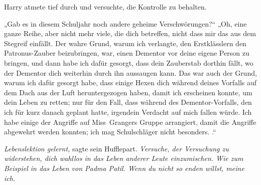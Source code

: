 Harry atmete tief durch und versuchte, die Kontrolle zu behalten.

„Gab es in diesem Schuljahr noch andere geheime Verschwörungen?“
„Oh, eine ganze Reihe, aber nicht mehr viele, die dich betreffen, nicht dass mir das aus dem Stegreif einfällt. Der wahre Grund, warum ich verlangte, den Erstklässlern den Patronus-Zauber beizubringen, war, einen Dementor vor deine eigene Person zu bringen, und dann habe ich dafür gesorgt, dass dein Zauberstab dorthin fällt, wo der Dementor dich weiterhin durch ihn aussaugen kann.  Das war auch der Grund, warum ich dafür gesorgt habe, dass einige Hexen dich während deines Vorfalls auf dem Dach aus der Luft heruntergezogen haben, damit ich erscheinen konnte, um dein Leben zu retten; nur für den Fall, dass während des Dementor-Vorfalls, den ich für kurz danach geplant hatte, irgendein Verdacht auf mich fallen würde.  Ich habe einige der Angriffe auf Miss~Grangers Gruppe arrangiert, damit die Angriffe abgewehrt werden konnten; ich mag Schulschläger nicht besonders. .“

\emph{Lebenslektion gelernt,} sagte sein Hufflepart. \emph{Versuche, der Versuchung zu widerstehen, dich wahllos in das Leben anderer Leute einzumischen. Wie zum Beispiel in das Leben von Padma Patil. Wenn du nicht so enden willst, meine ich.}

